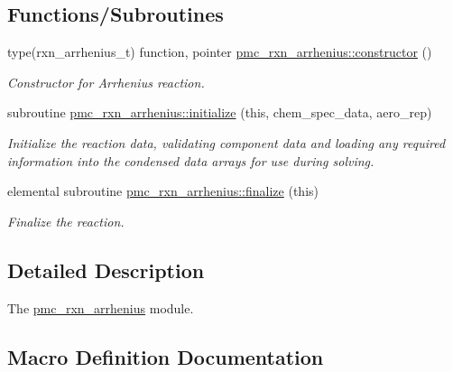 \subsection*{Functions/\+Subroutines}
\begin{DoxyCompactItemize}
\item 
type(rxn\+\_\+arrhenius\+\_\+t) function, pointer \mbox{\hyperlink{namespacepmc__rxn__arrhenius_a01eb485a07b0ebe221eafbd3895e7bb9}{pmc\+\_\+rxn\+\_\+arrhenius\+::constructor}} ()
\begin{DoxyCompactList}\small\item\em Constructor for Arrhenius reaction. \end{DoxyCompactList}\item 
subroutine \mbox{\hyperlink{namespacepmc__rxn__arrhenius_a98fac0a13ca490d21f4b3c0049645c09}{pmc\+\_\+rxn\+\_\+arrhenius\+::initialize}} (this, chem\+\_\+spec\+\_\+data, aero\+\_\+rep)
\begin{DoxyCompactList}\small\item\em Initialize the reaction data, validating component data and loading any required information into the condensed data arrays for use during solving. \end{DoxyCompactList}\item 
elemental subroutine \mbox{\hyperlink{namespacepmc__rxn__arrhenius_a88b969b655e039c6d75e80ff1a3cf77f}{pmc\+\_\+rxn\+\_\+arrhenius\+::finalize}} (this)
\begin{DoxyCompactList}\small\item\em Finalize the reaction. \end{DoxyCompactList}\end{DoxyCompactItemize}


\subsection{Detailed Description}
The \mbox{\hyperlink{namespacepmc__rxn__arrhenius}{pmc\+\_\+rxn\+\_\+arrhenius}} module. 



\subsection{Macro Definition Documentation}
\mbox{\label{rxn__arrhenius_8_f90_a71700f5633db3f99b43c798b09c60bd2}} 
